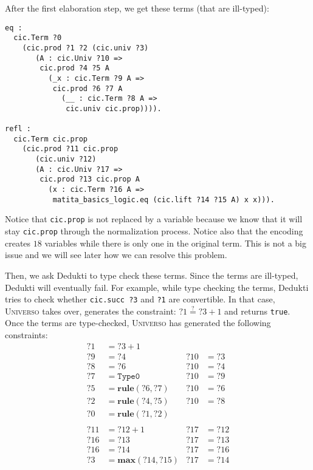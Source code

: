 \documentclass[conference]{IEEEtran}
\newcommand{\universo}{\textsc{Universo}}
\begin{document}
After the first elaboration step, we get these terms (that are ill-typed):
\begin{verbatim}
eq :
  cic.Term ?0
    (cic.prod ?1 ?2 (cic.univ ?3)
       (A : cic.Univ ?10 =>
        cic.prod ?4 ?5 A
          (_x : cic.Term ?9 A =>
           cic.prod ?6 ?7 A
             (__ : cic.Term ?8 A =>
              cic.univ cic.prop)))).

refl :
  cic.Term cic.prop
    (cic.prod ?11 cic.prop
       (cic.univ ?12)
       (A : cic.Univ ?17 =>
        cic.prod ?13 cic.prop A
          (x : cic.Term ?16 A =>
           matita_basics_logic.eq (cic.lift ?14 ?15 A) x x))).
\end{verbatim}

Notice that \texttt{cic.prop} is not replaced by a variable because we know that it will stay \texttt{cic.prop} through the normalization process. Notice also that the encoding creates \(18\) variables while there is only one in the original term. This is not a big issue and we will see later how we can resolve this problem.

Then, we ask Dedukti to type check these terms. Since the terms are ill-typed, Dedukti will eventually fail. For example, while type checking the terms, Dedukti tries to check whether \texttt{cic.succ ?3} and \texttt{?1} are convertible. In that case, \universo{} takes over, generates the constraint: \(?1 \stackrel{?}{=} ?3 + 1\) and returns \texttt{true}. Once the terms are type-checked, \universo{} has generated the following constraints:
\begin{align*}
  ?1 &= ?3 + 1 \\
  ?9 &= ?4     & ?10 &= ?3\\
  ?8 &= ?6     & ?10 &= ?4\\
  ?7 &= \mathtt{Type0} & ?10 &= ?9\\
  ?5 &= \mathbf{rule}(?6,?7)     & ?10 &= ?6\\
  ?2 &= \mathbf{rule}(?4,?5)     & ?10 &= ?8\\
  ?0 &= \mathbf{rule}(?1,?2)\\
  \\
  ?11 &= ?12 + 1 & ?17 &= ?12\\
  ?16 &= ?13 & ?17 &= ?13\\
  ?16 &= ?14 & ?17 &= ?16\\
  ?3 &= \mathbf{max}(?14,?15) & ?17 &= ?14\\
\end{align*}
\end{document}
